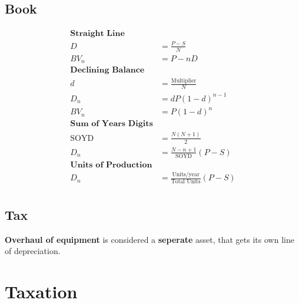 \documentclass[landscape, letterpaper, 10pt]{article}
\begin{document}
\begin{multicols}{3}
    \subsection*{Book}
    \begin{align*}
        \textbf{Straight Line}                                            \\
        D           & = \frac{P-S}{N}                                     \\
        BV_n        & = P-nD                                              \\
        \textbf {Declining Balance}                                       \\
        d           & = \frac{\text{Multiplier}}{N}                       \\
        D_n         & = dP(1-d)^{n-1}                                     \\
        BV_n        & = P(1-d)^n                                          \\
        \textbf {Sum of Years Digits}                                     \\
        \text{SOYD} & = \frac{N(N+1)}{2}                                  \\
        D_n         & = \frac{N-n+1}{\text{SOYD}}(P-S)                    \\
        \textbf{Units of Production}                                      \\
        D_n         & = \frac{\text{Units/year}}{\text{Total Units}}(P-S) \\
    \end{align*}
    \subsection*{Tax}
    \textbf{Overhaul of equipment} is considered a \textbf{seperate} asset, that gets its own line of depreciation.
    \section*{Taxation}

\end{multicols}
\end{document}
